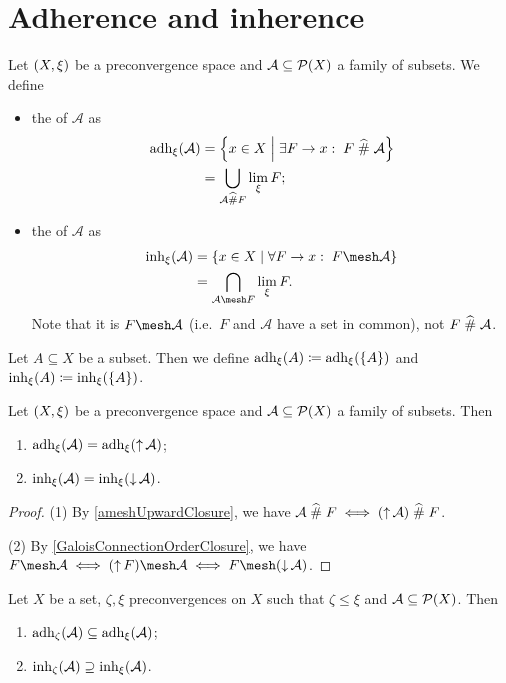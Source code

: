 \section{Adherence and inherence}
\begin{definition}
Let $\sSet{X,\xi}$ be a preconvergence space and $\mathcal{A}\subseteq \operatorname{\mathcal{P}}(X)$ a family of subsets. We define
\begin{itemize}
\item the  of $\mathcal{A}$ as
\begin{align*}
\adh_\xi(\mathcal{A}) &= \setbuilder{x\in X}{\exists F\to x: \; F\amesh\mathcal{A}} \\
&= \bigcup_{\mathcal{A}\amesh F}\lim_\xi F;
\end{align*}
\item the  of $\mathcal{A}$ as
\begin{align*}
\inh_\xi(\mathcal{A}) &= \setbuilder{x\in X}{\forall F\to x: \; F\mesh\mathcal{A}} \\
&= \bigcap_{\mathcal{A}\mesh F}\lim_\xi F.
\end{align*}
Note that it is $F\mesh\mathcal{A}$ (i.e.\ $F$ and $\mathcal{A}$ have a set in common), not $F\mathrel{\widehat{\#}}\mathcal{A}$.
\end{itemize}
Let $A\subseteq X$ be a subset. Then we define $\operatorname{adh}_\xi(A) \coloneqq \operatorname{adh}_\xi(\{A\})$ and $\operatorname{inh}_\xi(A) \coloneqq \operatorname{inh}_\xi(\{A\})$.
\end{definition}

\begin{lemma} \label{adherenceInherenceOrderClosure}
Let $\sSet{X,\xi}$ be a preconvergence space and $\mathcal{A}\subseteq \operatorname{\mathcal{P}}(X)$ a family of subsets. Then
\begin{enumerate}
\item $\operatorname{adh}_\xi(\mathcal{A}) = \operatorname{adh}_\xi(\operatorname{\uparrow}\mathcal{A})$;
\item $\operatorname{inh}_\xi(\mathcal{A}) = \operatorname{inh}_\xi(\operatorname{\downarrow}\mathcal{A})$.
\end{enumerate}
\end{lemma}
\begin{proof}
(1) By \ref{ameshUpwardClosure}, we have $\mathcal{A}\mathrel{\widehat{\#}} F \iff (\operatorname{\uparrow}\mathcal{A})\mathrel{\widehat{\#}} F$.

(2) By \ref{GaloisConnectionOrderClosure}, we have $F\mesh\mathcal{A} \iff (\upset F)\mesh\mathcal{A} \iff F\mesh(\downset \mathcal{A})$.
\end{proof}

\begin{lemma} \label{inherenceAdherenceMonotoneInConvergence}
Let $X$ be a set, $\zeta, \xi$ preconvergences on $X$ such that $\zeta \leq \xi$ and $\mathcal{A}\subseteq \operatorname{\mathcal{P}}(X)$. Then
\begin{enumerate}
\item $\operatorname{adh}_\zeta(\mathcal{A}) \subseteq \operatorname{adh}_\xi(\mathcal{A})$;
\item $\operatorname{inh}_\zeta(\mathcal{A}) \supseteq \operatorname{inh}_\xi(\mathcal{A})$.
\end{enumerate}
\end{lemma}

